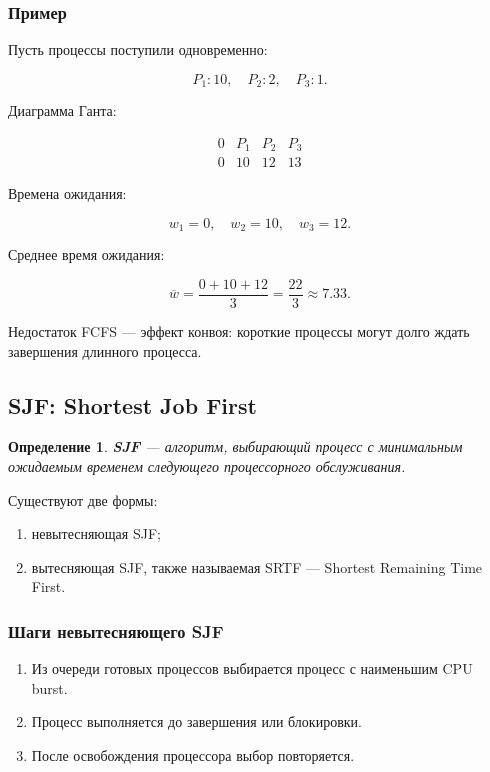 \documentclass[12pt,a4paper]{article}
\newtheorem{definition}{Определение}
\begin{document}
\subsubsection*{Пример}

Пусть процессы поступили одновременно:

\[
P_1: 10,\quad P_2: 2,\quad P_3: 1.
\]

Диаграмма Ганта:

\[
\begin{array}{c|c|c|c}
0 & P_1 & P_2 & P_3 \\
\hline
0 & 10 & 12 & 13
\end{array}
\]

Времена ожидания:

\[
w_1 = 0,\quad w_2 = 10,\quad w_3 = 12.
\]

Среднее время ожидания:

\[
\overline{w} = \frac{0 + 10 + 12}{3} = \frac{22}{3} \approx 7.33.
\]

Недостаток FCFS --- эффект конвоя: короткие процессы могут долго ждать завершения длинного процесса.

\subsection{SJF: Shortest Job First}

\begin{definition}
\textbf{SJF} --- алгоритм, выбирающий процесс с минимальным ожидаемым временем следующего процессорного обслуживания.
\end{definition}

Существуют две формы:

\begin{enumerate}
    \item невытесняющая SJF;
    \item вытесняющая SJF, также называемая SRTF --- Shortest Remaining Time First.
\end{enumerate}

\subsubsection*{Шаги невытесняющего SJF}

\begin{enumerate}
    \item Из очереди готовых процессов выбирается процесс с наименьшим CPU burst.
    \item Процесс выполняется до завершения или блокировки.
    \item После освобождения процессора выбор повторяется.
\end{enumerate}
\end{document}
